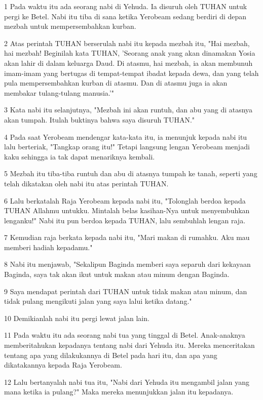 \par 1 Pada waktu itu ada seorang nabi di Yehuda. Ia disuruh oleh TUHAN untuk pergi ke Betel. Nabi itu tiba di sana ketika Yerobeam sedang berdiri di depan mezbah untuk mempersembahkan kurban.
\par 2 Atas perintah TUHAN berserulah nabi itu kepada mezbah itu, "Hai mezbah, hai mezbah! Beginilah kata TUHAN, 'Seorang anak yang akan dinamakan Yosia akan lahir di dalam keluarga Daud. Di atasmu, hai mezbah, ia akan membunuh imam-imam yang bertugas di tempat-tempat ibadat kepada dewa, dan yang telah pula mempersembahkan kurban di atasmu. Dan di atasmu juga ia akan membakar tulang-tulang manusia.'"
\par 3 Kata nabi itu selanjutnya, "Mezbah ini akan runtuh, dan abu yang di atasnya akan tumpah. Itulah buktinya bahwa saya disuruh TUHAN."
\par 4 Pada saat Yerobeam mendengar kata-kata itu, ia menunjuk kepada nabi itu lalu berteriak, "Tangkap orang itu!" Tetapi langsung lengan Yerobeam menjadi kaku sehingga ia tak dapat menariknya kembali.
\par 5 Mezbah itu tiba-tiba runtuh dan abu di atasnya tumpah ke tanah, seperti yang telah dikatakan oleh nabi itu atas perintah TUHAN.
\par 6 Lalu berkatalah Raja Yerobeam kepada nabi itu, "Tolonglah berdoa kepada TUHAN Allahmu untukku. Mintalah belas kasihan-Nya untuk menyembuhkan lenganku!" Nabi itu pun berdoa kepada TUHAN, lalu sembuhlah lengan raja.
\par 7 Kemudian raja berkata kepada nabi itu, "Mari makan di rumahku. Aku mau memberi hadiah kepadamu."
\par 8 Nabi itu menjawab, "Sekalipun Baginda memberi saya separuh dari kekayaan Baginda, saya tak akan ikut untuk makan atau minum dengan Baginda.
\par 9 Saya mendapat perintah dari TUHAN untuk tidak makan atau minum, dan tidak pulang mengikuti jalan yang saya lalui ketika datang."
\par 10 Demikianlah nabi itu pergi lewat jalan lain.
\par 11 Pada waktu itu ada seorang nabi tua yang tinggal di Betel. Anak-anaknya memberitahukan kepadanya tentang nabi dari Yehuda itu. Mereka menceritakan tentang apa yang dilakukannya di Betel pada hari itu, dan apa yang dikatakannya kepada Raja Yerobeam.
\par 12 Lalu bertanyalah nabi tua itu, "Nabi dari Yehuda itu mengambil jalan yang mana ketika ia pulang?" Maka mereka menunjukkan jalan itu kepadanya.
